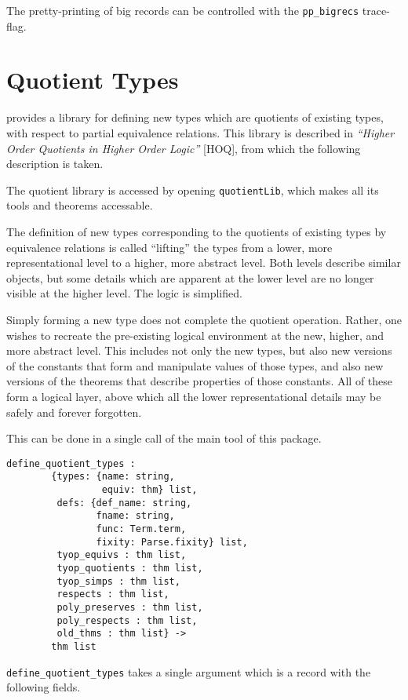 The pretty-printing of big records can be controlled with the
\texttt{pp\_bigrecs} trace-flag.


\section{Quotient Types}\label{quotients}

\HOL{} provides a library for defining new types which are quotients
of existing types, with respect to partial equivalence relations.
This library is described in {\it ``Higher Order Quotients in Higher
Order Logic''} [HOQ], from which the following description is taken.

The quotient library is accessed by opening {\tt quotientLib},
which makes all its tools and theorems accessable.

The definition of new types corresponding to the quotients of
existing types by equivalence relations is called ``lifting''
the types from a lower, more representational level to a higher,
more abstract level.  Both levels describe similar objects, but
some details which are apparent at the lower level are no longer
visible at the higher level.  The logic is simplified.

Simply forming a new type does not complete the quotient operation.
Rather, one wishes to recreate the
pre-existing logical environment at the new,
higher, and more abstract level.  This includes not only the new
types, but also new versions of the constants that form and
manipulate values of those types, and also new versions of the
theorems that describe properties of those constants.  All of these
form a logical layer, above which all the lower representational details
may be safely and forever forgotten.

This can be done in a single call of the
main tool of this package.

\begin{hol}
\begin{verbatim}
define_quotient_types :
        {types: {name: string,
                 equiv: thm} list,
         defs: {def_name: string,
                fname: string,
                func: Term.term,
                fixity: Parse.fixity} list,
         tyop_equivs : thm list,
         tyop_quotients : thm list,
         tyop_simps : thm list,
         respects : thm list,
         poly_preserves : thm list,
         poly_respects : thm list,
         old_thms : thm list} ->
        thm list
\end{verbatim}
\end{hol}
{\tt define\_quotient\_types} takes a single argument which is a
record with the following fields.

